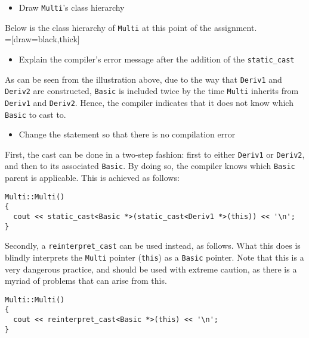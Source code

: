 \begin{itemize}
  \item Draw \texttt{Multi}'s class hierarchy
\end{itemize}
Below is the class hierarchy of \texttt{Multi} at this point of the assignment. \\

=[draw=black,thick]
\tikzset{sibling distance=18pt}

\begin{itemize}
  \item Explain the compiler's error message after the addition of the \texttt{static\_cast}
\end{itemize}

As can be seen from the illustration above, due to the way that \texttt{Deriv1} and \texttt{Deriv2} are constructed, \texttt{Basic} is included twice by the time \texttt{Multi} inherits from \texttt{Deriv1} and \texttt{Deriv2}. Hence, the compiler indicates that it does not know which \texttt{Basic} to cast to.

\begin{itemize}
  \item Change the statement so that there is no compilation error
\end{itemize}
First, the cast can be done in a two-step fashion: first to either \texttt{Deriv1} or \texttt{Deriv2}, and then to its associated \texttt{Basic}. By doing so, the compiler knows which \texttt{Basic} parent is applicable. This is achieved as follows: \\

\begin{lstlisting}[style=in, caption=c\_multi.cc]
Multi::Multi()
{
  cout << static_cast<Basic *>(static_cast<Deriv1 *>(this)) << '\n';
}
\end{lstlisting}

Secondly, a \texttt{reinterpret\_cast} can be used instead, as follows. What this does is blindly interprets the \texttt{Multi} pointer (\texttt{this}) as a \texttt{Basic} pointer. Note that this is a very dangerous practice, and should be used with extreme caution, as there is a myriad of problems that can arise from this. \\

\begin{lstlisting}[style=in, caption=c\_multi.cc]
Multi::Multi()
{
  cout << reinterpret_cast<Basic *>(this) << '\n';
}
\end{lstlisting}


